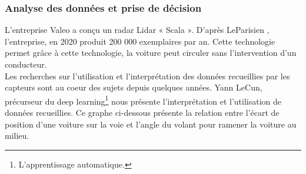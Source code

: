 \subsubsection{Analyse des données et prise de décision}
L'entreprise Valeo a conçu un radar Lidar « Scala ». D'après LeParisien \cite{le_parisien_radar_2019}, l'entreprise, en 2020 produit 200 000 exemplaires par an. Cette technologie permet grâce à cette technologie, la voiture peut circuler sans l’intervention d’un conducteur.\\
Les recherches sur l'utilisation et l'interprétation des données recueillies par les capteurs sont au coeur des sujets depuis quelques années. Yann LeCun, précurseur du deep learning\footnote{L'apprentissage automatique.} nous présente l'interprétation et l'utilisation de données recueillies.
Ce graphe ci-dessous présente la relation entre l’écart de position d’une voiture sur la voie et l’angle du volant pour ramener la voiture au milieu. 

